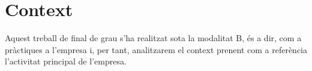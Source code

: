 \section{Context}
\label{intro:context}
Aquest treball de final de grau s'ha realitzat sota la modalitat B, és a dir, com a pràctiques a l'empresa i, per tant, analitzarem el context prenent com a referència l'activitat principal de l'empresa.\\



